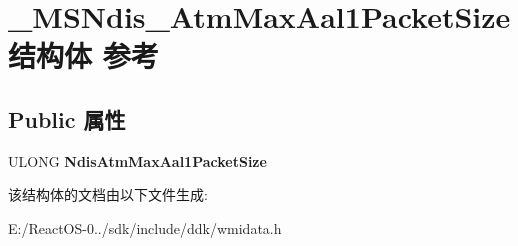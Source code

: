 \hypertarget{struct___m_s_ndis___atm_max_aal1_packet_size}{}\section{\+\_\+\+M\+S\+Ndis\+\_\+\+Atm\+Max\+Aal1\+Packet\+Size结构体 参考}
\label{struct___m_s_ndis___atm_max_aal1_packet_size}
\subsection*{Public 属性}
\begin{DoxyCompactItemize}
\item 
\mbox{\label{struct___m_s_ndis___atm_max_aal1_packet_size_a754baff655d0ce2ced64ec8fcbe9ae0d}} 
U\+L\+O\+NG {\bfseries Ndis\+Atm\+Max\+Aal1\+Packet\+Size}
\end{DoxyCompactItemize}


该结构体的文档由以下文件生成\+:\begin{DoxyCompactItemize}
\item 
E\+:/\+React\+O\+S-\/0../sdk/include/ddk/wmidata.\+h\end{DoxyCompactItemize}
